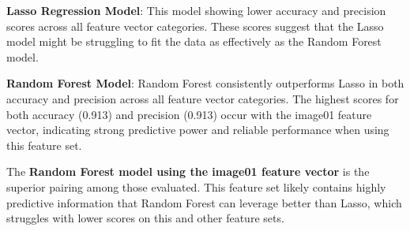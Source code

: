 \documentclass[conference,12pt]{IEEEtran}
\begin{document}
\begin{table}[h!]
\centering
\caption{Random Forest Model Performance Using Built-in Measures}
\label{table:random_forest_performance}
\end{table}

\textbf{Lasso Regression Model}: This model showing lower accuracy and precision scores across all feature vector categories. These scores suggest that the Lasso model might be struggling to fit the data as effectively as the Random Forest model.

\textbf{Random Forest Model}: Random Forest consistently outperforms Lasso in both accuracy and precision across all feature vector categories. The highest scores for both accuracy (0.913) and precision (0.913) occur with the image01 feature vector, indicating strong predictive power and reliable performance when using this feature set.

The \textbf{Random Forest model using the image01 feature vector} is the superior pairing among those evaluated. This feature set likely contains highly predictive information that Random Forest can leverage better than Lasso, which struggles with lower scores on this and other feature sets.
\end{document}
